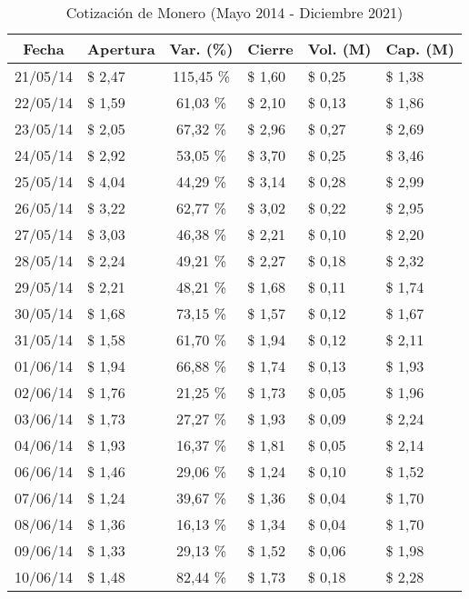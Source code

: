 \begin{center}
\begin{small}
\begin{longtable}{|c|l|c|l|l|l|}
\caption{Cotización de Monero (Mayo 2014 - Diciembre 2021)}
\label{tab:cotizacion-xmr-dolar}\\
\hline
\textbf{Fecha} & \textbf{Apertura} & \textbf{Var. (\%)} & \textbf{Cierre} & \textbf{Vol. (M)} & \textbf{Cap. (M)} \\ \hline
21/05/14 & \$ 2,47 & 115,45 \% & \$ 1,60 & \$ 0,25 & \$ 1,38 \\ \hline
22/05/14 & \$ 1,59 & 61,03 \% & \$ 2,10 & \$ 0,13 & \$ 1,86 \\ \hline
23/05/14 & \$ 2,05 & 67,32 \% & \$ 2,96 & \$ 0,27 & \$ 2,69 \\ \hline
24/05/14 & \$ 2,92 & 53,05 \% & \$ 3,70 & \$ 0,25 & \$ 3,46 \\ \hline
25/05/14 & \$ 4,04 & 44,29 \% & \$ 3,14 & \$ 0,28 & \$ 2,99 \\ \hline
26/05/14 & \$ 3,22 & 62,77 \% & \$ 3,02 & \$ 0,22 & \$ 2,95 \\ \hline
27/05/14 & \$ 3,03 & 46,38 \% & \$ 2,21 & \$ 0,10 & \$ 2,20 \\ \hline
28/05/14 & \$ 2,24 & 49,21 \% & \$ 2,27 & \$ 0,18 & \$ 2,32 \\ \hline
29/05/14 & \$ 2,21 & 48,21 \% & \$ 1,68 & \$ 0,11 & \$ 1,74 \\ \hline
30/05/14 & \$ 1,68 & 73,15 \% & \$ 1,57 & \$ 0,12 & \$ 1,67 \\ \hline
31/05/14 & \$ 1,58 & 61,70 \% & \$ 1,94 & \$ 0,12 & \$ 2,11 \\ \hline
01/06/14 & \$ 1,94 & 66,88 \% & \$ 1,74 & \$ 0,13 & \$ 1,93 \\ \hline
02/06/14 & \$ 1,76 & 21,25 \% & \$ 1,73 & \$ 0,05 & \$ 1,96 \\ \hline
03/06/14 & \$ 1,73 & 27,27 \% & \$ 1,93 & \$ 0,09 & \$ 2,24 \\ \hline
04/06/14 & \$ 1,93 & 16,37 \% & \$ 1,81 & \$ 0,05 & \$ 2,14 \\ \hline
06/06/14 & \$ 1,46 & 29,06 \% & \$ 1,24 & \$ 0,10 & \$ 1,52 \\ \hline
07/06/14 & \$ 1,24 & 39,67 \% & \$ 1,36 & \$ 0,04 & \$ 1,70 \\ \hline
08/06/14 & \$ 1,36 & 16,13 \% & \$ 1,34 & \$ 0,04 & \$ 1,70 \\ \hline
09/06/14 & \$ 1,33 & 29,13 \% & \$ 1,52 & \$ 0,06 & \$ 1,98 \\ \hline
10/06/14 & \$ 1,48 & 82,44 \% & \$ 1,73 & \$ 0,18 & \$ 2,28 \\ \hline

\end{longtable}
\end{small}
\end{center}
